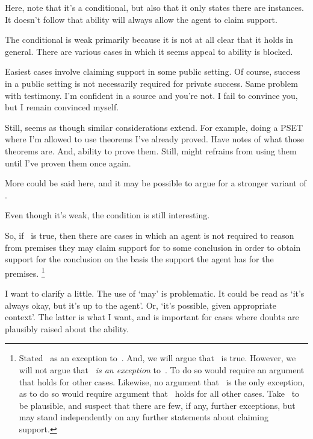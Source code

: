\begin{note}[Conditional]
  Here, note that it's a conditional, but also that it only states there are instances.
  It doesn't follow that ability will always allow the agent to claim support.

  The conditional is weak primarily because it is not at all clear that it holds in general.
  There are various cases in which it seems appeal to ability is blocked.

  Easiest cases involve claiming support in some public setting.
  Of course, success in a public setting is not necessarily required for private success.
  Same problem with testimony.
  I'm confident in a source and you're not.
  I fail to convince you, but I remain convinced myself.

  Still, seems as though similar considerations extend.
  For example, doing a PSET where I'm allowed to use theorems I've already proved.
  Have notes of what those theorems are.
  And, ability to prove them.
  Still, might refrains from using them until I've proven them once again.

  More could be said here, and it may be possible to argue for a stronger variant of \EAS{}.

  Even though it's weak, the condition is still interesting.
\end{note}


\begin{note}
  So, if~\EAS{} is true, then there are cases in which an agent is not required to reason from premises they may claim support for to some conclusion in order to obtain support for the conclusion on the basis the support the agent has for the premises.\nolinebreak
  \footnote{
    Stated~\EAS{} as an exception to~\ESU{}.
    And, we will argue that~\EAS{} is true.
    However, we will not argue that~\EAS{} \emph{is an exception} to~\ESU{}.
    To do so would require an argument that \ESU{} holds for other cases.
    Likewise, no argument that~\EAS{} is the only exception, as to do so would require argument that~\ESU{} holds for all other cases.
    Take~\ESU{} to be plausible, and suspect that there are few, if any, further exceptions, but~\EAS{} may stand independently on any further statements about claiming support.
  }
\end{note}

\begin{note}
  \color{red}
  I want to clarify \EAS{} a little.
  The use of `may' is problematic.
  It could be read as `it's always okay, but it's up to the agent'.
  Or, `it's possible, given appropriate context'.
  The latter is what I want, and is important for cases where doubts are plausibly raised about the ability.
\end{note}

